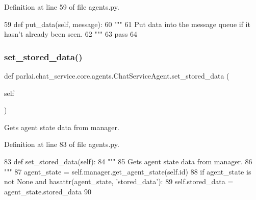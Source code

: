 Definition at line 59 of file agents.\+py.


\begin{DoxyCode}
59     \textcolor{keyword}{def }put\_data(self, message):
60         \textcolor{stringliteral}{"""}
61 \textcolor{stringliteral}{        Put data into the message queue if it hasn't already been seen.}
62 \textcolor{stringliteral}{        """}
63         \textcolor{keywordflow}{pass}
64 
\end{DoxyCode}
\mbox{\label{classparlai_1_1chat__service_1_1core_1_1agents_1_1ChatServiceAgent_aec768d94205566700ac4addfc4740166}} 
\subsubsection{\texorpdfstring{set\+\_\+stored\+\_\+data()}{set\_stored\_data()}}
{\footnotesize\ttfamily def parlai.\+chat\+\_\+service.\+core.\+agents.\+Chat\+Service\+Agent.\+set\+\_\+stored\+\_\+data (\begin{DoxyParamCaption}\item[{}]{self }\end{DoxyParamCaption})}

\begin{DoxyVerb}Gets agent state data from manager.
\end{DoxyVerb}
 

Definition at line 83 of file agents.\+py.


\begin{DoxyCode}
83     \textcolor{keyword}{def }set\_stored\_data(self):
84         \textcolor{stringliteral}{"""}
85 \textcolor{stringliteral}{        Gets agent state data from manager.}
86 \textcolor{stringliteral}{        """}
87         agent\_state = self.manager.get\_agent\_state(self.id)
88         \textcolor{keywordflow}{if} agent\_state \textcolor{keywordflow}{is} \textcolor{keywordflow}{not} \textcolor{keywordtype}{None} \textcolor{keywordflow}{and} hasattr(agent\_state, \textcolor{stringliteral}{'stored\_data'}):
89             self.stored\_data = agent\_state.stored\_data
90 
\end{DoxyCode}


